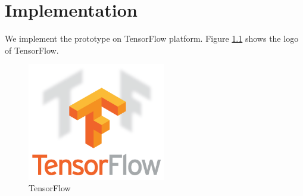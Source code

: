 \chapter{Implementation} \label{chapter:implementation}

We implement the prototype on TensorFlow\cite{tensorflow} platform. Figure \ref{figure:tensorflow} shows the logo of TensorFlow.

\begin{figure}[h!]
\centering
\includegraphics[width=6cm,keepaspectratio]{figures/tensorflow.png}
\caption{TensorFlow}
\label{figure:tensorflow}
\end{figure}